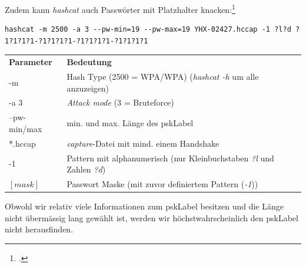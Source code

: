 Zudem kann \textit{hashcat} auch Passwörter mit Platzhalter knacken:\footcite{mask_attack_hashcat_wiki_2015-04-13}
\begin{lstlisting}[style=lstStyleFramed]
hashcat -m 2500 -a 3 --pw-min=19 --pw-max=19 YHX-02427.hccap -1 ?l?d ?1?1?1?1-?1?1?1?1-?1?1?1?1-?1?1?1?1
\end{lstlisting}
\begin{tabular}{l l}
	\textbf{Parameter} & \textbf{Bedeutung}\\
	-m & Hash Type (2500 = WPA/WPA) (\textit{hashcat -h} um alle anzuzeigen)\\
	-a 3 & \textit{Attack mode} (3 = Bruteforce)\\
	--pw-min/max & min. und max. Länge des \gls{pskLabel}\\
	*.hccap & \textit{capture}-Datei mit mind. einem Handshake\\
	-1 & Pattern mit alphanumerisch (nur Kleinbuchstaben \textit{?l} und Zahlen \textit{?d})\\
	$[mask]$ & Passwort Maske (mit zuvor definiertem Pattern (\textit{-1}))\\
\end{tabular}

Obwohl wir relativ viele Informationen zum \gls{pskLabel} besitzen und die Länge nicht übermässig lang gewählt ist, werden wir höchstwahrscheinlich den \gls{pskLabel} nicht herausfinden.






